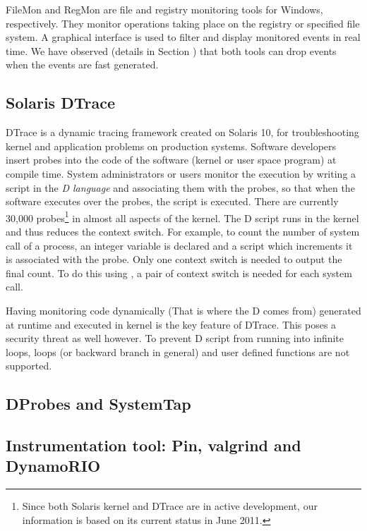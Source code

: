 FileMon \cite{filemon} and RegMon \cite{regmon}
are file and registry monitoring tools for Windows, respectively.
They monitor operations taking place on
the registry or specified file system.
A graphical interface is used to filter and display monitored events in real time.
We have observed (details in Section ) that both tools can drop events when the
events are fast generated.


\subsection{Solaris DTrace}
\label{sec:dtrace}

DTrace\cite{cantrill2004dynamic} is a dynamic tracing framework
created on Solaris 10, for troubleshooting kernel and application problems
on production systems.
Software developers insert probes into the code of the software
(kernel or user space program) at compile time.
System administrators or users monitor the execution by writing
a script in the {\em D language} and associating them with the probes,
so that when the software executes over the probes, the script is executed.
There are currently 30,000  probes\footnote{
Since both Solaris kernel and DTrace are in active development,
our information is based on its current status in June 2011.}
in almost all aspects of the kernel.
The D script runs in the kernel and thus reduces the context switch.
For example, to count the number of  system call of a process,
an integer variable is declared and a script which increments it
is associated with the  probe.
Only one context switch is needed to output the final count.
To do this using , a pair of context switch is
needed for each  system call.

Having monitoring code dynamically (That is where the D comes from)
generated at runtime and executed in kernel is the key feature of
DTrace.
This poses a security threat as well however.
To prevent D script from running into infinite loops,
loops (or backward branch in general) and user defined functions
are not supported.


\subsection{DProbes and SystemTap}
\label{sec:systemtap}

\subsection{Instrumentation tool: Pin, valgrind and DynamoRIO}
\label{sec:instrumentation}
